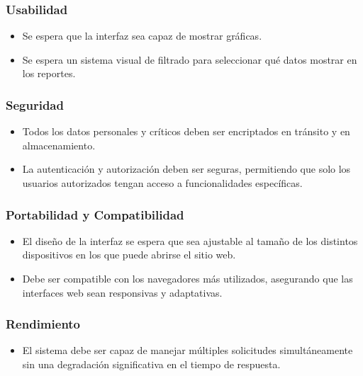 \documentclass{report}
\begin{document}
    \subsubsection*{Usabilidad}
    \begin{itemize}
        \item Se espera que la interfaz sea capaz de mostrar gráficas.
        \item Se espera un sistema visual de filtrado para seleccionar qué datos mostrar en los reportes.
    \end{itemize}

    \subsubsection*{Seguridad}
    \begin{itemize}
        \item Todos los datos personales y críticos deben ser encriptados en tránsito y en almacenamiento.
        \item La autenticación y autorización deben ser seguras, permitiendo que solo los usuarios autorizados tengan 
        acceso a funcionalidades específicas.
    \end{itemize}

    \subsubsection*{Portabilidad y Compatibilidad}
    \begin{itemize}
        \item El diseño de la interfaz se espera que sea ajustable al tamaño de los distintos dispositivos en los que 
        puede abrirse el sitio web.
        \item Debe ser compatible con los navegadores más utilizados, asegurando que las interfaces web sean 
        responsivas y adaptativas.
    \end{itemize}

    \subsubsection*{Rendimiento}
    \begin{itemize}
        \item El sistema debe ser capaz de manejar múltiples solicitudes simultáneamente sin una degradación 
        significativa en el tiempo de respuesta.
    \end{itemize}
\end{document}
